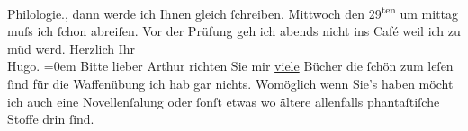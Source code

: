 \begin{ledgroupsized}[t]{13cm}
{{{                        Philologie.}}}\label{K_L00808_2h}, dann werde {\pb}ich Ihnen gleich ſchreiben.
                        Mittwoch den 29\textsuperscript{ten} um mittag muſs ich ſchon abreiſen.\pend
           \pstart
           Vor der Prüfung geh ich abends nicht ins Café weil ich zu müd werd.\pend
           \pstart
           Herzlich Ihr{\\[\baselineskip]}\spacefill\mbox{Hugo.}\pend
           \leftskip=0em{}\pstart
           \noindent{}Bitte lieber Arthur richten Sie {\pb}mir \uline{viele} Bücher die ſchön zum leſen ſind für die Waffenübung ich
                        hab gar nichts. Womöglich wenn Sie’s haben möcht ich auch eine Novellenſa{\geminationm}lung oder ſonſt etwas wo ältere allenfalls
                        phantaſtiſche Stoffe drin ſind.\pend
                     \endnumbering{}\end{ledgroupsized}  \newcommand{\dateiname}{L00808}\newcommand{\titel}{Hugo von Hofmannsthal an Arthur Schnitzler, [21. 6. 1898]}\newcommand{\editorInnen}{Martin Anton Müller und Gerd-Hermann Susen}
            \footnotesize
\begin{ledgroupsized}[t]{11.5cm}
\end{ledgroupsized}
         
      